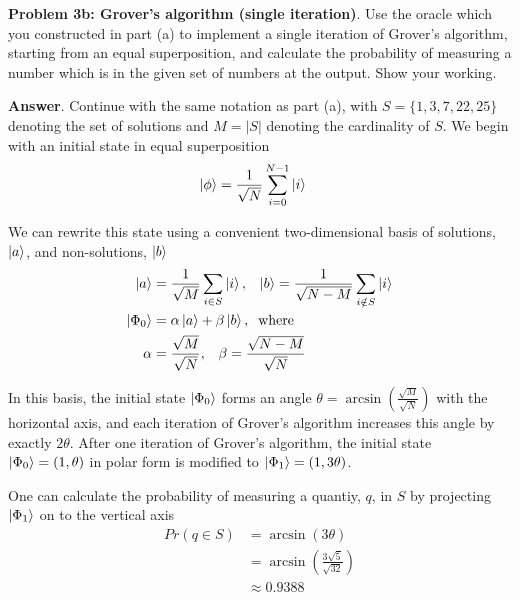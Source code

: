\textbf{Problem 3b: Grover's algorithm (single iteration)}. Use the oracle which you constructed in part (a) to implement a single iteration of Grover's algorithm, starting from an equal superposition, and calculate the probability of measuring a number which is in the given set of numbers at the output. 
Show your working.


\textbf{Answer}. Continue with the same notation as part (a), with $S = \{1, 3, 7, 22, 25\}$ denoting the set of solutions and
$M=|S|$ denoting the cardinality of $S$.
We begin with an initial state in equal superposition
\begin{align*}
\ket{\phi} &= \frac{1}{\sqrt{N}}\sum_{i=0}^{N-1}\ket{i}
\end{align*}

We can rewrite this state using a convenient two-dimensional basis of solutions, $\ket{a}$, and non-solutions, $\ket{b}$
\begin{align*}
	\ket{a} &= \frac{1}{\sqrt{M}}\sum_{i \in S}\ket{i},\;\;\; \ket{b} = \frac{1}{\sqrt{N-M}}\sum_{i \notin S}\ket{i} \\
	\ket{\Phi_0} &= \alpha \ket{a} + \beta \ket{b},\;\; \text{where} \\ 
	\alpha &= \frac{\sqrt{M}}{\sqrt{N}}, \;\;\; \beta = \frac{\sqrt{N-M}}{\sqrt{N}}
\end{align*}

In this basis, the initial state $\ket{\Phi_0}$ forms an angle $\theta = \arcsin (\frac{\sqrt{M}}{\sqrt{N}})$ with the horizontal axis, and each iteration of Grover's algorithm increases this angle by exactly $2\theta$.
After one iteration of Grover's algorithm, the initial state $\ket{\Phi_0} = (1, \theta)$ in polar form is modified to $\ket{\Phi_1} = (1, 3\theta)$.

One can calculate the probability of measuring a quantiy, $q$, in $S$ by projecting $\ket{\Phi_1}$ on to the vertical axis
\begin{align*}
	Pr(q \in S) &= \arcsin(3\theta) \\
	&= \arcsin(\frac{3\sqrt{5}}{\sqrt{32}}) \\
	&\approx 0.9388
\end{align*}


